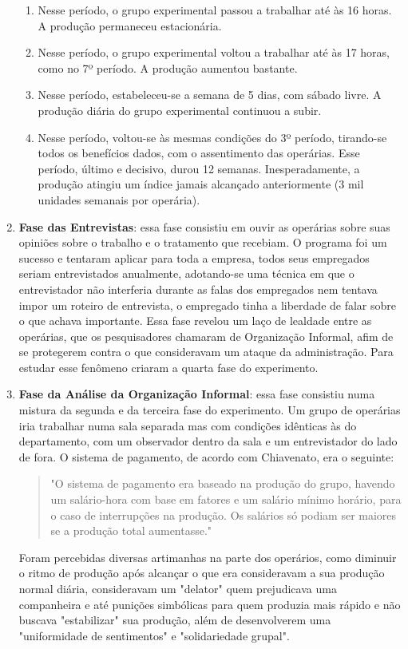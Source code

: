 \begin{enumerate}
\begin{enumerate}
			\item Nesse período, o grupo experimental passou a trabalhar até às 16 horas. A produção permaneceu estacionária.
			\item Nesse período, o grupo experimental voltou a trabalhar até às 17 horas, como no 7º período. A	produção aumentou bastante.
			\item Nesse período, estabeleceu-se a semana de 5 dias, com sábado livre. A produção diária do grupo experimental continuou a subir.
			\item Nesse período, voltou-se às mesmas condições do 3º período, tirando-se todos os benefícios dados, com o assentimento das operárias. Esse período, último e decisivo, durou 12 semanas. Inesperadamente, a produção atingiu um índice jamais alcançado anteriormente (3 mil unidades semanais por operária).
		\end{enumerate}
	
	\item \textbf{Fase das Entrevistas}: essa fase consistiu em ouvir as operárias sobre suas opiniões sobre o trabalho e o tratamento que recebiam. O programa foi um sucesso e tentaram aplicar para toda a empresa, todos seus empregados seriam entrevistados anualmente, adotando-se uma técnica em que o entrevistador não interferia durante as falas dos empregados nem tentava impor um roteiro de entrevista, o empregado tinha a liberdade de falar sobre o que achava importante. Essa fase revelou um laço de lealdade entre as operárias, que os pesquisadores chamaram de Organização Informal, afim de se protegerem contra o que consideravam um ataque da administração. Para estudar esse fenômeno criaram a quarta fase do experimento.
	
	\item \textbf{Fase da Análise da Organização Informal}: essa fase consistiu numa mistura da segunda e da terceira fase do experimento. Um grupo de operárias iria trabalhar numa sala separada mas com condições idênticas às do departamento, com um observador dentro da sala e um entrevistador do lado de fora. O sistema de pagamento, de acordo com Chiavenato, era o seguinte:
		\begin{quote}
			"O sistema de pagamento era baseado na produção do grupo, havendo um salário-hora com base em fatores e um salário mínimo horário, para o caso de interrupções na produção. Os salários só podiam ser maiores se a produção total aumentasse."
		\end{quote}
	Foram percebidas diversas artimanhas na parte dos operários, como diminuir o ritmo de produção após alcançar o que era consideravam a sua produção normal diária, consideravam um "delator" quem prejudicava uma companheira e até punições simbólicas para quem produzia mais rápido e não buscava "estabilizar" sua produção, além de desenvolverem uma "uniformidade de sentimentos" e "solidariedade grupal".
	
\end{enumerate}
	